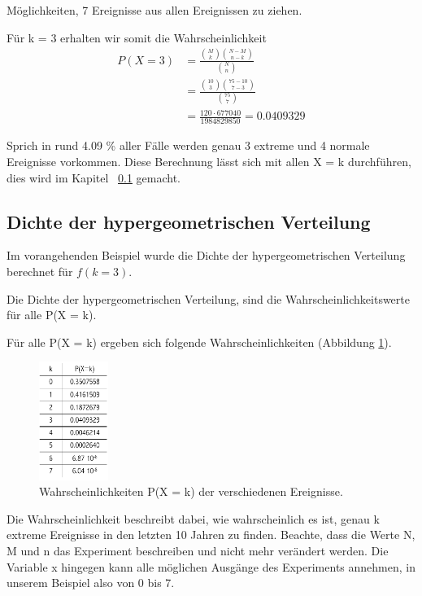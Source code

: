 \begin{refsection}
Möglichkeiten, 7 Ereignisse aus allen Ereignissen zu ziehen.


Für k = 3 erhalten wir somit die Wahrscheinlichkeit
\begin{align*}
P(X = 3) &= \frac{ \binom{M}{k} \binom{N-M}{n-k}}{ \binom{N}{n} }  \\
&= \frac{ \binom{10}{3} \binom{75-10}{7-3}}{ \binom{75}{7} } \\
&= \frac{ 120 \cdot 677040}{ 1984829850 } = 0.0409329
\end{align*}

Sprich in rund 4.09 \% aller Fälle werden genau 3 extreme und 4 normale Ereignisse vorkommen. Diese Berechnung lässt sich mit allen X = k durchführen, dies wird im Kapitel ~\ref{Dichtehyper}  gemacht.


\subsection{Dichte der hypergeometrischen Verteilung} \label{Dichtehyper}
Im vorangehenden Beispiel wurde die Dichte der hypergeometrischen Verteilung berechnet für $f(k = 3)$. 

\begin{definition}
Die Dichte der hypergeometrischen Verteilung, sind die Wahrscheinlichkeitswerte für alle P(X = k).
\end{definition}

Für alle P(X = k) ergeben sich folgende Wahrscheinlichkeiten (Abbildung \ref{TabHyper}).

\begin{figure}[htbp]
\centering
\includegraphics[width=0.2\textwidth]{extrem/TabHyper.pdf}
\caption{Wahrscheinlichkeiten P(X = k) der verschiedenen Ereignisse.}
\label{TabHyper}
\end{figure}

Die Wahrscheinlichkeit beschreibt dabei, wie wahrscheinlich es ist, genau k extreme Ereignisse in den letzten 10 Jahren zu finden.
Beachte, dass die Werte N, M und n das Experiment beschreiben und nicht mehr verändert werden. Die Variable x hingegen kann alle möglichen Ausgänge des Experiments annehmen, in unserem Beispiel also von 0 bis 7.


\end{refsection}
